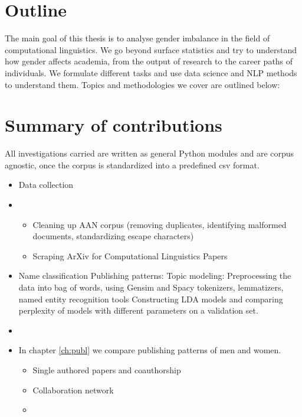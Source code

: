 \documentclass[bsc,frontabs,twoside,singlespacing,parskip,deptreport]{infthesis}     %
\begin{document}
\section{Outline}

The main goal of this thesis is to analyse gender imbalance in the field of computational linguistics. We go beyond surface statistics and try to understand how gender affects academia, from the output of research to the career paths of individuals. We formulate different tasks and use data science and NLP methods to understand them. Topics and methodologies we cover are outlined below:

\section{Summary of contributions}
 All investigations carried are written as general Python modules and are corpus agnostic, once the corpus is standardized into a predefined csv format.
\begin{itemize}
\item{Data collection}
\item{
    \begin{itemize} 
    \item{Cleaning up AAN corpus (removing duplicates, identifying      malformed documents, standardizing escape characters)}
    \item{Scraping ArXiv for Computational Linguistics Papers}
    \end{itemize}
}
\item{Name classification
 \be}
Publishing patterns:
Topic modeling:
 Preprocessing the data into bag of words, using Gensim and Spacy tokenizers, lemmatizers, named entity recognition tools
 Constructing LDA models and comparing perplexity of models with different parameters on a validation set.
 \end{itemize}
 

\begin{itemize}
\item 
\item In chapter \ref{ch:publ} we compare publishing patterns of men and women. 
    \begin{itemize}
    \item Single authored papers and coauthorship
    \item Collaboration network
    \item 
    \end{itemize}
\end{itemize}
\end{document}
